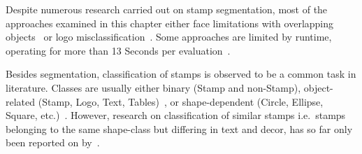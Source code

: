 Despite numerous research carried out on stamp segmentation, most of the 
approaches examined in this chapter either face limitations with overlapping 
objects~\cite{Nandedkar.2015, Nandedkar.2015b, 
Forczmanski.2016, Ahmed.2013, Dey.2015, 
Forczmanski.2015, Forczmanski.2016} or logo misclassification~\cite
{Ahmed.2013, Dey.2015,Micenkova.2011}. Some
approaches are limited by runtime, operating for more than 13 Seconds per
evaluation~\cite{Ahmed.2016,Nandedkar.2015}.
\par
Besides segmentation, classification of stamps is observed to be a common task 
in literature. Classes are usually either binary (Stamp and non-Stamp), 
object-related (Stamp, Logo, Text, Tables)~\cite{Forczmanski.2016,
Nandedkar.2015, Nandedkar.2015b, Dey.2015},
or shape-dependent (Circle, Ellipse, Square, etc.)~\cite{Forczmanski.2015}.
However, research on classification of similar stamps i.e.\ stamps belonging to
the same shape-class but differing in text and decor, has so far only been
reported on by~\cite{Petej.2013}.